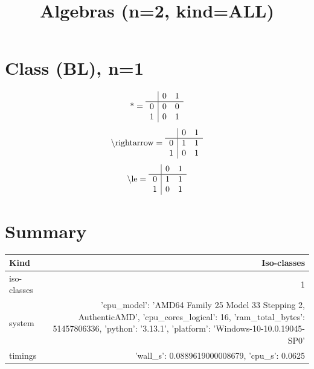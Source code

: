 \documentclass[11pt]{article}
\title{Algebras (n=2, kind=ALL)}
\date{}
\begin{document}
\maketitle
\tableofcontents
\section{Class (BL), n=1}
\[\text{*} = 
\begin{array}{r | r r}
 & 0 & 1 \\ \hline
0 & 0 & 0 \\
1 & 0 & 1 \\
\end{array}
\]
\[\text{\textbackslash rightarrow} = 
\begin{array}{r | r r}
 & 0 & 1 \\ \hline
0 & 1 & 1 \\
1 & 0 & 1 \\
\end{array}
\]
\[\text{\textbackslash le} = 
\begin{array}{r | r r}
 & 0 & 1 \\ \hline
0 & 1 & 1 \\
1 & 0 & 1 \\
\end{array}
\]

\section*{Summary}
\begin{tabular}{lr}
\toprule
Kind & Iso-classes\\\midrule
iso-classes & 1\\
system & {'cpu_model': 'AMD64 Family 25 Model 33 Stepping 2, AuthenticAMD', 'cpu_cores_logical': 16, 'ram_total_bytes': 51457806336, 'python': '3.13.1', 'platform': 'Windows-10-10.0.19045-SP0'}\\
timings & {'wall_s': 0.0889619000008679, 'cpu_s': 0.0625}\\
\bottomrule
\end{tabular}
\end{document}
